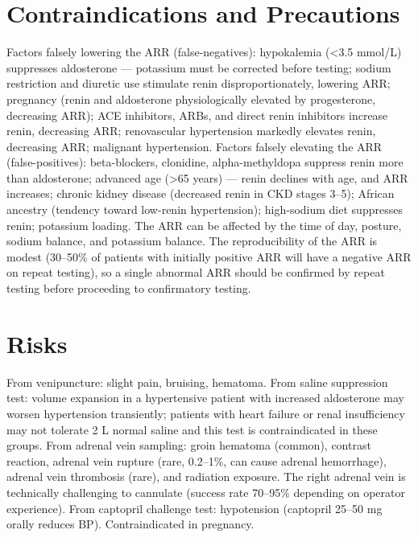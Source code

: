 \section*{Contraindications and Precautions}
Factors falsely lowering the ARR (false-negatives): hypokalemia (<3.5 mmol/L) suppresses aldosterone --- potassium must be corrected before testing; sodium restriction and diuretic use stimulate renin disproportionately, lowering ARR; pregnancy (renin and aldosterone physiologically elevated by progesterone, decreasing ARR); ACE inhibitors, ARBs, and direct renin inhibitors increase renin, decreasing ARR; renovascular hypertension markedly elevates renin, decreasing ARR; malignant hypertension. Factors falsely elevating the ARR (false-positives): beta-blockers, clonidine, alpha-methyldopa suppress renin more than aldosterone; advanced age (>65 years) --- renin declines with age, and ARR increases; chronic kidney disease (decreased renin in CKD stages 3--5); African ancestry (tendency toward low-renin hypertension); high-sodium diet suppresses renin; potassium loading. The ARR can be affected by the time of day, posture, sodium balance, and potassium balance. The reproducibility of the ARR is modest (30--50\% of patients with initially positive ARR will have a negative ARR on repeat testing), so a single abnormal ARR should be confirmed by repeat testing before proceeding to confirmatory testing.

\section*{Risks}
From venipuncture: slight pain, bruising, hematoma. From saline suppression test: volume expansion in a hypertensive patient with increased aldosterone may worsen hypertension transiently; patients with heart failure or renal insufficiency may not tolerate 2 L normal saline and this test is contraindicated in these groups. From adrenal vein sampling: groin hematoma (common), contrast reaction, adrenal vein rupture (rare, 0.2--1\%, can cause adrenal hemorrhage), adrenal vein thrombosis (rare), and radiation exposure. The right adrenal vein is technically challenging to cannulate (success rate 70--95\% depending on operator experience). From captopril challenge test: hypotension (captopril 25--50 mg orally reduces BP). Contraindicated in pregnancy.

